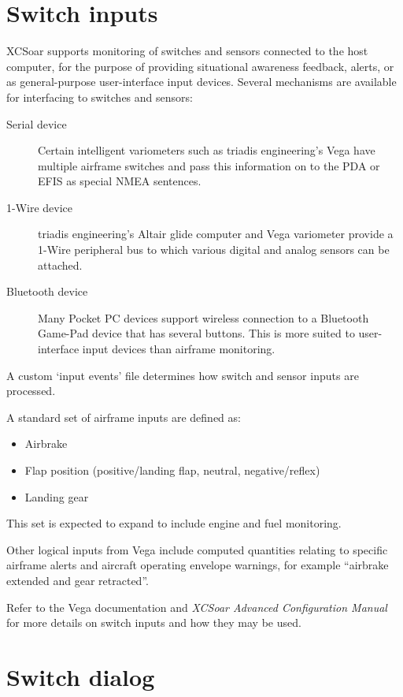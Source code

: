 \documentclass[a4paper,12pt]{refrep}
\begin{document}
\section{Switch inputs}

XCSoar supports monitoring of switches and sensors connected to the
host computer, for the purpose of providing situational awareness
feedback, alerts, or as general-purpose user-interface input devices.
Several mechanisms are available for interfacing to switches and
sensors:
\begin{description}
\item[Serial device]  Certain intelligent variometers such as
 triadis engineering's Vega have multiple airframe switches
 and pass this information on to the PDA or EFIS as special
 NMEA sentences.
\item[1-Wire device]  triadis engineering's Altair glide computer
 and Vega variometer provide a 1-Wire peripheral bus to which
 various digital and analog sensors can be attached.
\item[Bluetooth device]  Many Pocket PC devices support wireless
 connection to a Bluetooth Game-Pad device that has several buttons.
 This is more suited to user-interface input devices than airframe
 monitoring.
\end{description}

A custom `input events' file determines how switch and sensor
inputs are processed.

A standard set of airframe inputs are defined as:
\begin{itemize}
\item Airbrake
\item Flap position (positive/landing flap, neutral, negative/reflex)
\item Landing gear
\end{itemize}

This set is expected to expand to include engine and fuel monitoring.

Other logical inputs from Vega include computed quantities relating to
specific airframe alerts and aircraft operating envelope warnings, for
example ``airbrake extended and gear retracted''.  

Refer to the Vega documentation and {\em XCSoar Advanced Configuration
Manual} for more details on switch inputs and how they may be used.

\section{Switch dialog}
\end{document}
